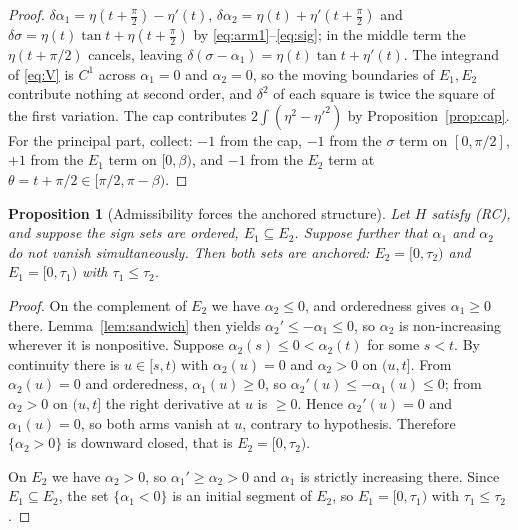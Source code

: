 \documentclass[11pt]{article}
\newtheorem{proposition}[theorem]{Proposition}
\theoremstyle{definition}
\begin{document}
\begin{proof}
$\delta\alpha_1=\eta(t+\tfrac\pi2)-\eta'(t)$, $\delta\alpha_2=\eta(t)+\eta'(t+\tfrac\pi2)$
and $\delta\sigma=\eta(t)\tan t+\eta(t+\tfrac\pi2)$ by \eqref{eq:arm1}--\eqref{eq:sig};
in the middle term the $\eta(t+\pi/2)$ cancels, leaving
$\delta(\sigma-\alpha_1)=\eta(t)\tan t+\eta'(t)$. The integrand of \eqref{eq:V} is $C^1$
across $\alpha_1=0$ and $\alpha_2=0$, so the moving boundaries of $E_1,E_2$ contribute
nothing at second order, and $\delta^2$ of each square is twice the square of the
first variation. The cap contributes $2\int(\eta^2-\eta'^2)$ by
Proposition~\ref{prop:cap}. For the principal part, collect: $-1$ from the cap,
$-1$ from the $\sigma$ term on $[0,\pi/2]$, $+1$ from the $E_1$ term on $[0,\beta)$,
and $-1$ from the $E_2$ term at $\theta=t+\pi/2\in[\pi/2,\pi-\beta)$.
\end{proof}

\begin{proposition}[Admissibility forces the anchored structure]\label{prop:anchor}
Let $H$ satisfy (RC), and suppose the sign sets are ordered, $E_1\subseteq E_2$. Suppose
further that $\alpha_1$ and $\alpha_2$ do not vanish simultaneously. Then both sets are
anchored: $E_2=[0,\tau_2)$ and $E_1=[0,\tau_1)$ with $\tau_1\le\tau_2$.
\end{proposition}

\begin{proof}
On the complement of $E_2$ we have $\alpha_2\le0$, and orderedness gives
$\alpha_1\ge0$ there. Lemma~\ref{lem:sandwich} then yields
$\alpha_2'\le-\alpha_1\le0$, so $\alpha_2$ is non-increasing wherever it is
nonpositive. Suppose $\alpha_2(s)\le0<\alpha_2(t)$ for some $s<t$. By continuity there is
$u\in[s,t)$ with $\alpha_2(u)=0$ and $\alpha_2>0$ on $(u,t]$. From $\alpha_2(u)=0$ and
orderedness, $\alpha_1(u)\ge0$, so $\alpha_2'(u)\le-\alpha_1(u)\le0$; from
$\alpha_2>0$ on $(u,t]$ the right derivative at $u$ is $\ge0$. Hence
$\alpha_2'(u)=0$ and $\alpha_1(u)=0$, so both arms vanish at $u$, contrary to hypothesis.
Therefore $\{\alpha_2>0\}$ is downward closed, that is $E_2=[0,\tau_2)$.

On $E_2$ we have $\alpha_2>0$, so $\alpha_1'\ge\alpha_2>0$ and $\alpha_1$ is strictly
increasing there. Since $E_1\subseteq E_2$, the set $\{\alpha_1<0\}$ is an initial segment
of $E_2$, so $E_1=[0,\tau_1)$ with $\tau_1\le\tau_2$.
\end{proof}
\end{document}
